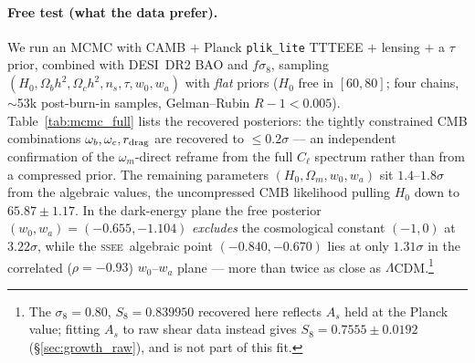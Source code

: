 \documentclass[12pt,a4paper]{article}
\newcommand{\SSEE}{\textsc{ssee}}
\newcommand{\LCDM}{$\Lambda$CDM}
\begin{document}
\paragraph{Free test (what the data prefer).}
We run an MCMC with CAMB $+$ Planck \texttt{plik\_lite} TTTEEE $+$ lensing $+$ a
$\tau$ prior, combined with DESI~DR2 BAO and $f\sigma_8$, sampling
$(H_0,\Omega_bh^2,\Omega_c h^2,n_s,\tau,w_0,w_a)$ with \emph{flat} priors ($H_0$
free in $[60,80]$; four chains, $\sim$53k post-burn-in samples, Gelman--Rubin
$R-1<0.005$). Table~\ref{tab:mcmc_full} lists the recovered posteriors: the
tightly constrained CMB combinations $\omega_b,\omega_c,r_{\rm drag}$ are
recovered to $\le0.2\sigma$ --- an independent confirmation of the
$\omega_m$-direct reframe from the full $C_\ell$ spectrum rather than from a
compressed prior. The remaining parameters $(H_0,\Omega_m,w_0,w_a)$ sit
$1.4$--$1.8\sigma$ from the algebraic values, the uncompressed CMB likelihood
pulling $H_0$ down to $65.87\pm1.17$. In the dark-energy plane
the free posterior $(w_0,w_a)=(-0.655,-1.104)$ \emph{excludes} the cosmological
constant $(-1,0)$ at $3.22\sigma$, while the \SSEE\ algebraic point
$(-0.840,-0.670)$ lies at only $1.31\sigma$ in the correlated ($\rho=-0.93$)
$w_0$--$w_a$ plane --- more than twice as close as \LCDM.\footnote{The
$\sigma_8=0.80$, $S_8=0.839950$ recovered here reflects $A_s$ held at the
Planck value; fitting $A_s$ to raw shear data instead gives
$S_8=0.7555\pm0.0192$ (\S\ref{sec:growth_raw}), and is not part of this fit.}
\end{document}
